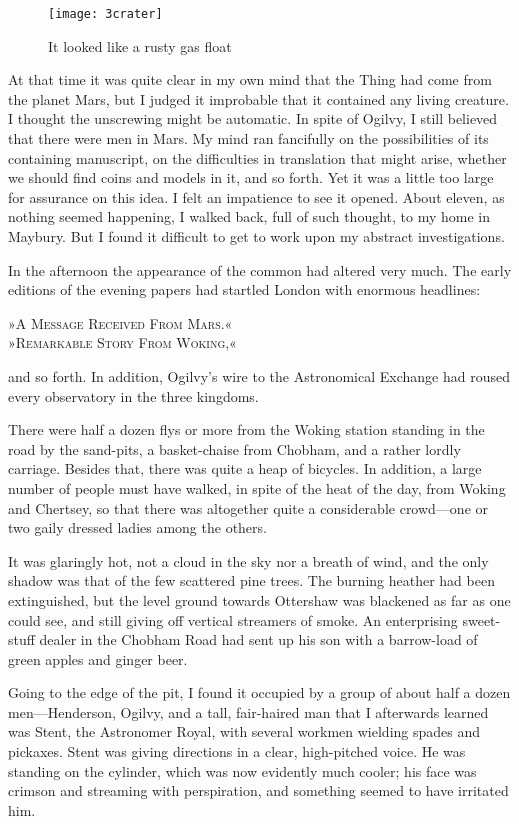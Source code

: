 \begin{sidewaysfigure}
\texttt{[image: 3crater]}%
\caption{It looked like a rusty gas float}
\end{sidewaysfigure}

At that time it was quite clear in my own mind that the Thing had come from the planet Mars, but I judged it improbable that it contained any living creature. I thought the unscrewing might be automatic. In spite of Ogilvy, I still believed that there were men in Mars. My mind ran fancifully on the possibilities of its containing manuscript, on the difficulties in translation that might arise, whether we should find coins and models in it, and so forth. Yet it was a little too large for assurance on this idea. I felt an impatience to see it opened. About eleven, as nothing seemed happening, I walked back, full of such thought, to my home in Maybury. But I found it difficult to get to work upon my abstract investigations.

In the afternoon the appearance of the common had altered very much. The early editions of the evening papers had startled London with enormous headlines:

\begin{center}\scshape
»A Message Received From Mars.«\\
»Remarkable Story From Woking,«
\end{center}

and so forth. In addition, Ogilvy's wire to the Astronomical Exchange had roused every observatory in the three kingdoms.

There were half a dozen flys or more from the Woking station standing in the road by the sand-pits, a basket-chaise from Chobham, and a rather lordly carriage. Besides that, there was quite a heap of bicycles. In addition, a large number of people must have walked, in spite of the heat of the day, from Woking and Chertsey, so that there was altogether quite a considerable crowd—one or two gaily dressed ladies among the others.

It was glaringly hot, not a cloud in the sky nor a breath of wind, and the only shadow was that of the few scattered pine trees. The burning heather had been extinguished, but the level ground towards Ottershaw was blackened as far as one could see, and still giving off vertical streamers of smoke. An enterprising sweet-stuff dealer in the Chobham Road had sent up his son with a barrow-load of green apples and ginger beer.

Going to the edge of the pit, I found it occupied by a group of about half a dozen men—Henderson, Ogilvy, and a tall, fair-haired man that I afterwards learned was Stent, the Astronomer Royal, with several workmen wielding spades and pickaxes. Stent was giving directions in a clear, high-pitched voice. He was standing on the cylinder, which was now evidently much cooler; his face was crimson and streaming with perspiration, and something seemed to have irritated him.


